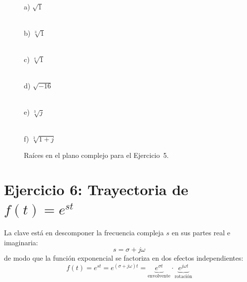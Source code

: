 \documentclass[10pt,a4paper]{article}
\begin{document}
\begin{figure}[H]
	\centering
	\begin{minipage}[b]{0.30\textwidth}
		\centering 
		\\[2pt]
		{\small a) $\sqrt{1}$}
	\end{minipage}
	\hfill
	\begin{minipage}[b]{0.30\textwidth}
		\centering
		\\[2pt]
		{\small b) $\sqrt[3]{1}$}
	\end{minipage}
	\hfill
	\begin{minipage}[b]{0.30\textwidth}
		\centering
		\\[2pt]
		{\small c) $\sqrt[4]{1}$}
	\end{minipage}

	\vspace{0.8em}

	\begin{minipage}[b]{0.30\textwidth}
		\centering
		\\[2pt]
		{\small d) $\sqrt{-16}$}
	\end{minipage}
	\hfill
	\begin{minipage}[b]{0.30\textwidth}
		\centering
		\\[2pt]
		{\small e) $\sqrt[3]{j}$}
	\end{minipage}
	\hfill
	\begin{minipage}[b]{0.30\textwidth}
		\centering
		\\[2pt]
		{\small f) $\sqrt[3]{1+j}$}
	\end{minipage}

	\caption{Raíces en el plano complejo para el Ejercicio~5.}
	\label{fig:ejer5}
\end{figure}

\section*{Ejercicio 6: Trayectoria de $f(t) = e^{st}$}

La clave está en descomponer la frecuencia compleja $s$ en sus partes real e imaginaria:
$$s = \sigma + j\omega$$
de modo que la función exponencial se factoriza en dos efectos independientes:
\begin{equation*}
	f(t) = e^{st} = e^{(\sigma+j\omega)t}
	= \underbrace{e^{\sigma t}}_{\text{envolvente}} \cdot \underbrace{e^{j\omega t}}_{\text{rotación}}
\end{equation*}
\end{document}
